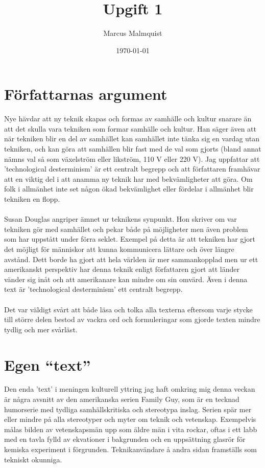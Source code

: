 \documentclass[12pt,a4paper]{article}
\title{Upgift 1}
\author{Marcus Malmquist}
\date{\today}
\begin{document}
\maketitle

\section*{Författarnas argument}
Nye hävdar att ny teknik skapas och formas av samhälle och kultur snarare än att det skulla vara tekniken som formar samhälle och kultur. Han säger även att när tekniken blir en del av samhället kan samhället inte tänka sig en vardag utan tekniken, och kan göra att samhällen blir fast med de val som gjorts (bland annat nämns val så som växelström eller likström, 110 V eller 220 V).
Jag uppfattar att 'technological desterminism' är ett centralt begrepp och att författaren framhävar att en viktig del i att anamma ny teknik har med bekvämligheter att göra. Om folk i allmänhet inte set någon ökad bekvämlighet eller fördelar i allmänhet blir tekniken en flopp.\\\\
\noindent Susan Douglas angriper ämnet ur teknikens synpunkt. Hon skriver om var tekniken gör med samhället och pekar både på möjligheter men även problem som har uppstått under förra seklet. Exempel på detta är att tekniken har gjort det möjligt för människor att kunna kommunicera lättare och över längre avstånd. Dett borde ha gjort att hela världen är mer sammankopplad men ur ett amerikanskt perspektiv har denna teknik enligt författaren gjort att länder vänder sig inåt och att amerikanare kan mindre om sin omvärd.
Även i denna text är 'technological desterminism' ett centralt begrepp.\\\\
\noindent Det var väldigt svårt att både läsa och tolka alla texterna eftersom varje stycke till större delen bestod av vackra ord och formuleringar som gjorde texten mindre tydlig och mer svårläst.

\section*{Egen ``text''}
Den enda 'text' i meningen kulturell yttring jag haft omkring mig denna veckan är några avsnitt av den amerikanska serien Family Guy, som är en tecknad humorserie med tydliga samhällskritiska och stereotypa inslag. Serien spär mer eller mindre på alla stereotyper och myter om teknik och vetenskap.
Exempelvis målas bilden av vetenskapsmän upp som äldre män i vita rockar, oftas i ett labb med en tavla fylld av ekvationer i bakgrunden och en uppsättning glasrör för kemiska experiment i förgrunden. Teknikanvändare å andra sidan framställs som tekniskt okunniga.
\end{document}
